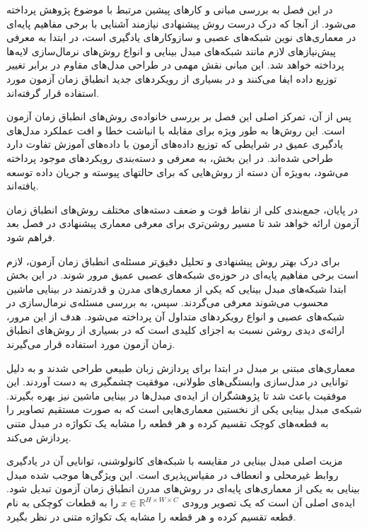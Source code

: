

در این فصل به بررسی مبانی و کارهای پیشین مرتبط با موضوع پژوهش پرداخته می‌شود. از آنجا که درک درست روش پیشنهادی نیازمند آشنایی با برخی مفاهیم پایه‌ای در معماری‌های نوین شبکه‌های عصبی و سازوکارهای یادگیری است، در ابتدا به معرفی پیش‌نیازهای لازم مانند شبکه‌های {مبدل بینایی}\cite{vit} و انواع روش‌های {نرمال‌سازی} لایه‌ها پرداخته خواهد شد. این مبانی نقش مهمی در طراحی مدل‌های مقاوم در برابر تغییر توزیع داده ایفا می‌کنند و در بسیاری از رویکردهای جدید انطباق زمان آزمون مورد استفاده قرار گرفته‌اند.

پس از آن، تمرکز اصلی این فصل بر بررسی خانواده‌ی روش‌های انطباق زمان آزمون است. این روش‌ها به طور ویژه برای مقابله با انباشت خطا و افت عملکرد مدل‌های یادگیری عمیق در شرایطی که توزیع داده‌های آزمون با داده‌های آموزش تفاوت دارد طراحی شده‌اند. در این بخش، به معرفی و دسته‌بندی رویکردهای موجود پرداخته می‌شود، به‌ویژه آن دسته از روش‌هایی که برای حالتهای پیوسته و جریان داده توسعه یافته‌اند.

در پایان، جمع‌بندی کلی از نقاط قوت و ضعف دسته‌های مختلف روش‌های انطباق زمان آزمون ارائه خواهد شد تا مسیر روشن‌تری برای معرفی معماری پیشنهادی در فصل بعد فراهم شود.


برای درک بهتر روش پیشنهادی و تحلیل دقیق‌تر مسئله‌ی انطباق زمان آزمون، لازم است برخی مفاهیم پایه‌ای در حوزه‌ی شبکه‌های عصبی عمیق مرور شوند. در این بخش ابتدا شبکه‌های مبدل بینایی که یکی از معماری‌های مدرن و قدرتمند در بینایی ماشین محسوب می‌شوند معرفی می‌گردند. سپس، به بررسی مسئله‌ی نرمال‌سازی در شبکه‌های عصبی و انواع رویکردهای متداول آن پرداخته می‌شود. هدف از این مرور، ارائه‌ی دیدی روشن نسبت به اجزای کلیدی است که در بسیاری از روش‌های انطباق زمان آزمون مورد استفاده قرار می‌گیرند.


معماری‌های مبتنی بر {مبدل}\cite{vit} در ابتدا برای پردازش زبان طبیعی طراحی شدند و به دلیل توانایی در مدل‌سازی وابستگی‌های طولانی‌، موفقیت چشمگیری به دست آوردند. این موفقیت باعث شد تا پژوهشگران از ایده‌ی مبدل‌ها در بینایی ماشین نیز بهره بگیرند. شبکه‌ی مبدل بینایی یکی از نخستین معماری‌هایی است که به صورت مستقیم تصاویر را به قطعه‌های کوچک تقسیم کرده و هر قطعه را مشابه یک {تکواژه} در مبدل متنی پردازش می‌کند.

مزیت اصلی مبدل بینایی در مقایسه با شبکه‌های {کانولوشنی}، توانایی آن در یادگیری روابط غیرمحلی و انعطاف در مقیاس‌پذیری است. این ویژگی‌ها موجب شده مبدل بینایی به یکی از معماری‌های پایه‌ای در روش‌های مدرن انطباق زمان آزمون تبدیل شود. ایده‌ی اصلی آن است که یک تصویر ورودی 
\(
x \in \mathbb{R}^{H \times W \times C}
\)
را به قطعات کوچکی به نام {قطعه} تقسیم کرده و هر قطعه را مشابه یک تکواژه متنی در نظر بگیرد.  

